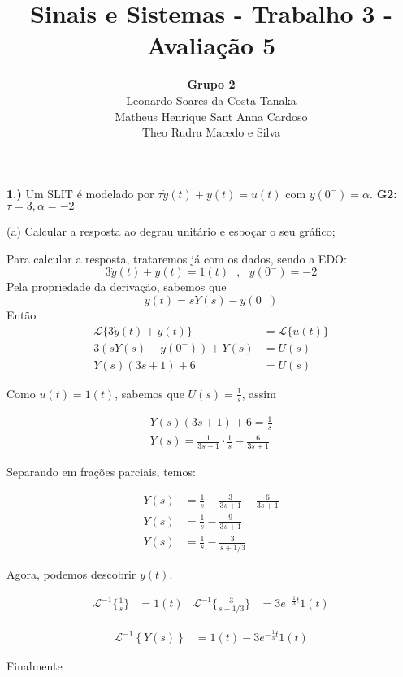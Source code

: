 \documentclass{article}
\title{Sinais e Sistemas - Trabalho 3 - Avaliação 5}
\author{
    \textbf{Grupo 2}\\
    Leonardo Soares da Costa Tanaka\\
    Matheus Henrique Sant Anna Cardoso\\
    Theo Rudra Macedo e Silva
}
\date{}
\begin{document}
\maketitle
\thispagestyle{capa}

\newpage

\textbf{1.)} Um SLIT é modelado por $\tau \dot{y}(t) + y(t) = u(t)$ com $y(0^{-}) = \alpha$.
\textbf{G2:} $\tau = 3, \alpha = -2$

(a) Calcular a resposta ao degrau unitário e esboçar o seu gráfico;

Para calcular a resposta, trataremos já com os dados, sendo a EDO:
\[3\dot{y}(t) + y(t) = 1(t)\,\,\,\,,\,\,\,\,y(0^{-}) = -2\]
Pela propriedade da derivação, sabemos que
\[\dot{y}(t) = sY(s) - y(0^{-})\]
Então
\begin{align*}
    \mathcal{L}\{3\dot{y}(t) + y(t)\} &= \mathcal{L}\{u(t)\}\\
    3(sY(s) - y(0^-)) + Y(s) &= U(s)\\
    Y(s)(3s + 1) + 6 &= U(s)
\end{align*}

Como $u(t) = 1(t)$, sabemos que $U(s) = \frac{1}{s}$, assim

\begin{align*}
    Y(s)(3s + 1) + 6 = \frac{1}{s}\\
    Y(s) = \frac{1}{3s + 1} \cdot \frac{1}{s} - \frac{6}{3s + 1}
\end{align*}

Separando em frações parciais, temos:

\begin{align*}
    Y(s) &= \frac{1}{s} - \frac{3}{3s + 1} - \frac{6}{3s + 1}\\
    Y(s) &= \frac{1}{s} - \frac{9}{3s + 1}\\
    Y(s) &= \frac{1}{s} - \frac{3}{s + 1/3}
\end{align*}

Agora, podemos descobrir $y(t)$.

\begin{align*}
    \mathcal{L}^{-1} \biggl\{\frac{1}{s}\biggr\} &= 1(t) & \mathcal{L}^{-1}\biggl\{\frac{3}{s + 1/3}\biggr\} &= 3e^{-\frac{1}{3}t}1(t)
\end{align*}

\begin{align*}
    \mathcal{L}^{-1} \left\{Y(s)\right\} &= 1(t) - 3e^{-\frac{1}{3}t}1(t)
\end{align*}

Finalmente
\end{document}
